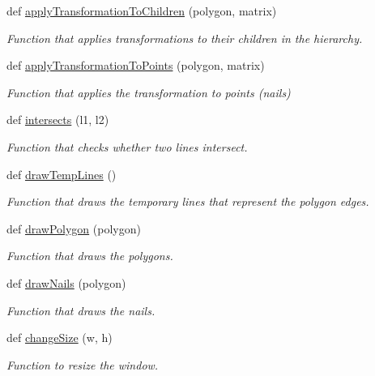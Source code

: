 \begin{DoxyCompactItemize}
def \hyperlink{namespacemain_aeae47c61066756f699b19bf97f937370}{apply\+Transformation\+To\+Children} (polygon, matrix)
\begin{DoxyCompactList}\small\item\em Function that applies transformations to their children in the hierarchy. \end{DoxyCompactList}\item 
def \hyperlink{namespacemain_a69cc12fb1c27fecdfcac61f5d4e917b9}{apply\+Transformation\+To\+Points} (polygon, matrix)
\begin{DoxyCompactList}\small\item\em Function that applies the transformation to points (nails) \end{DoxyCompactList}\item 
def \hyperlink{namespacemain_afa0ac21cfc8ed3c2c3cfddd6ea6899b6}{intersects} (l1, l2)
\begin{DoxyCompactList}\small\item\em Function that checks whether two lines intersect. \end{DoxyCompactList}\item 
\mbox{\label{namespacemain_aa9279d9a799d74c5bf21beff5da0062a}} 
def \hyperlink{namespacemain_aa9279d9a799d74c5bf21beff5da0062a}{draw\+Temp\+Lines} ()
\begin{DoxyCompactList}\small\item\em Function that draws the temporary lines that represent the polygon edges. \end{DoxyCompactList}\item 
def \hyperlink{namespacemain_a923e8cecbed43bf133611a409c40c107}{draw\+Polygon} (polygon)
\begin{DoxyCompactList}\small\item\em Function that draws the polygons. \end{DoxyCompactList}\item 
def \hyperlink{namespacemain_a020b084aad026564a4c7ee5af1ac6b91}{draw\+Nails} (polygon)
\begin{DoxyCompactList}\small\item\em Function that draws the nails. \end{DoxyCompactList}\item 
def \hyperlink{namespacemain_a526cfe84f4e80095febf0d3f4b7b5358}{change\+Size} (w, h)
\begin{DoxyCompactList}\small\item\em Function to resize the window. \end{DoxyCompactList}\item 

\end{DoxyCompactItemize}
